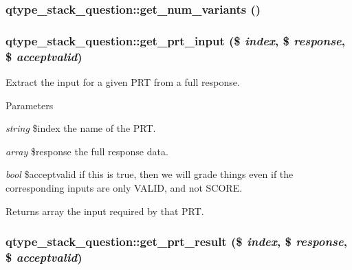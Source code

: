 \hypertarget{classqtype__stack__question_a4fa4675e759d7d72e9781e462ac6663d}{
\subsubsection[{get\_\-num\_\-variants}]{\setlength{\rightskip}{0pt plus 5cm}qtype\_\-stack\_\-question::get\_\-num\_\-variants ()}}
\label{classqtype__stack__question_a4fa4675e759d7d72e9781e462ac6663d}
\hypertarget{classqtype__stack__question_ae1369f6232dae4ac45154d4c259e7ef9}{
\subsubsection[{get\_\-prt\_\-input}]{\setlength{\rightskip}{0pt plus 5cm}qtype\_\-stack\_\-question::get\_\-prt\_\-input (\$ {\em index}, \/  \$ {\em response}, \/  \$ {\em acceptvalid})}}
\label{classqtype__stack__question_ae1369f6232dae4ac45154d4c259e7ef9}
Extract the input for a given PRT from a full response. 
\begin{DoxyParams}{Parameters}
\item[{\em string}]\$index the name of the PRT. \item[{\em array}]\$response the full response data. \item[{\em bool}]\$acceptvalid if this is true, then we will grade things even if the corresponding inputs are only VALID, and not SCORE. \end{DoxyParams}
\begin{DoxyReturn}{Returns}
array the input required by that PRT. 
\end{DoxyReturn}
\hypertarget{classqtype__stack__question_a2b51301e407f2ca52ae85778496cf43e}{
\subsubsection[{get\_\-prt\_\-result}]{\setlength{\rightskip}{0pt plus 5cm}qtype\_\-stack\_\-question::get\_\-prt\_\-result (\$ {\em index}, \/  \$ {\em response}, \/  \$ {\em acceptvalid})}}
